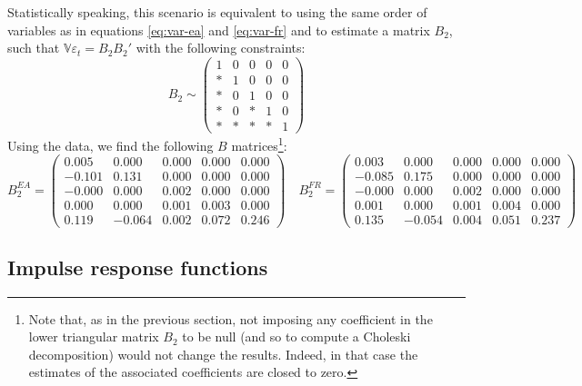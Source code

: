 \documentclass[
  11pt,
]{article}
\begin{document}
Statistically speaking, this scenario is equivalent to using the same order of variables as in equations \eqref{eq:var-ea} and \eqref{eq:var-fr} and to estimate a matrix \(B_2\), such that \(\mathbb V\varepsilon_t=B_2B_2'\) with the following constraints:
\[ B_2\sim\begin{pmatrix}1 & 0 & 0 & 0 & 0\\
* & 1 & 0 & 0 & 0\\
* & 0 & 1 & 0 & 0\\
* & 0 & * & 1 & 0\\
* & * & * & * & 1
\end{pmatrix}\]
Using the data, we find the following \(B\) matrices\footnote{
  Note that, as in the previous section, not imposing any coefficient in the lower triangular matrix \(B_2\) to be null (and so to compute a Choleski decomposition) would not change the results.
  Indeed, in that case the estimates of the associated coefficients are closed to zero.}:
\[B_2^{EA} =\begin{pmatrix}
 0.005 & 0.000 & 0.000 & 0.000 & 0.000 \\
-0.101 & 0.131 & 0.000 & 0.000 & 0.000 \\
-0.000 & 0.000 & 0.002 & 0.000 & 0.000 \\
0.000 & 0.000 & 0.001 & 0.003 & 0.000 \\
0.119 & -0.064 & 0.002 & 0.072 & 0.246 
\end{pmatrix}
\quad
B_2^{FR}=\begin{pmatrix}
 0.003 & 0.000 & 0.000 & 0.000 & 0.000 \\
-0.085 & 0.175 & 0.000 & 0.000 & 0.000 \\
-0.000 & 0.000 & 0.002 & 0.000 & 0.000 \\
0.001 & 0.000 & 0.001 & 0.004 & 0.000 \\
0.135 & -0.054 & 0.004 & 0.051 & 0.237 
\end{pmatrix}\]

\hypertarget{impulse-response-functions}{%
\subsection{Impulse response functions}\label{impulse-response-functions}}
\end{document}
